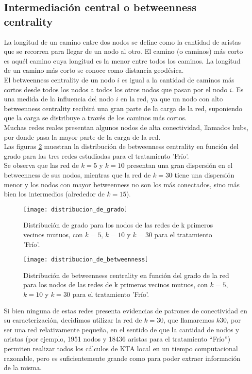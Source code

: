 \subsection*{Intermediación central o betweenness centrality}
La longitud de un camino entre dos nodos se define como la cantidad de aristas que se recorren para llegar de un nodo al otro. El camino (o caminos) más corto es aquél camino cuya longitud es la menor entre todos los caminos. La longitud de un camino más corto se conoce como distancia geodésica.\\
El betweenness centrality de un nodo $i$ es igual a la cantidad de caminos más cortos desde todos los nodos a todos los otros nodos que pasan por el nodo $i$. Es una medida de la influencia del nodo $i$ en la red, ya que un nodo con alto betweenness centrality recibirá una gran parte de la carga de la red, suponiendo que la carga se distribuye a través de los caminos más cortos.\\
Muchas redes reales presentan algunos nodos de alta conectividad, llamados hubs, por donde pasa la mayor parte de la carga de la red.\\
Las figuras \ref{fig:distribucion_de_betweenness} muestran la distribución de betweenness centrality en función del grado para las tres redes estudiadas para el tratamiento 'Frío'.\\
Se observa que las red de $k=5$ y $k=10$ presentan una gran dispersión en el betweenness de sus nodos, mientras que la red de $k=30$ tiene una dispersión menor y los nodos con mayor betweenness no son los más conectados, sino más bien los intermedios (alrededor de $k=15$).\\
\begin{figure}[h]
\centering
\texttt{[image: distribucion\_de\_grado]}
\caption{Distribución de grado para los nodos de las redes de k primeros vecinos mutuos, con $k=5$, $k=10$ y $k=30$ para el tratamiento 'Frío'.}
\label{fig:distribucion_de_grado}
\end{figure}
\begin{figure}[h]
\centering
\texttt{[image: distribucion\_de\_betweenness]}
\caption{Distribución de betweenness centrality en función del grado de la red para los nodos de las redes de k primeros vecinos mutuos, con $k=5$, $k=10$ y $k=30$ para el tratamiento 'Frío'.}
\label{fig:distribucion_de_betweenness}
\end{figure}
Si bien ninguna de estas redes presenta evidencias de patrones de conectividad en su caracterización, decidimos utilizar la red de $k=30$, que llamaremos $k30$, por ser una red relativamente pequeña, en el sentido de que la cantidad de nodos y aristas (por ejemplo, 1951 nodos y 18436 aristas para el tratamiento ``Frío'') permiten realizar todos los cálculos de KTA local en un tiempo computacional razonable, pero es suficientemente grande como para poder extraer información de la misma.
